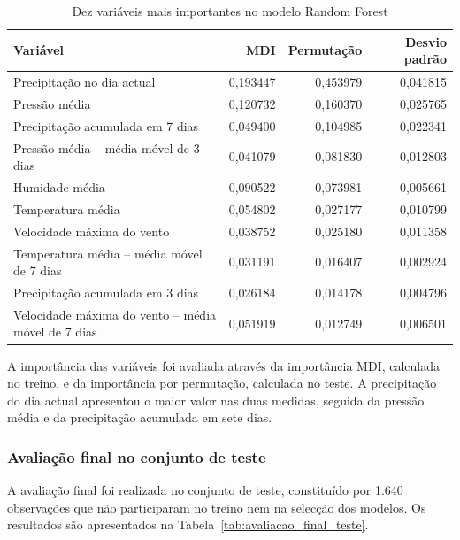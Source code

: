 \documentclass[9pt,twocolumn,twoside,english,portuguese]{opticajnl}
\begin{document}
    \begin{table}[H]
    \centering
    \footnotesize
    \caption{Dez variáveis mais importantes no modelo Random Forest}
    \label{tab:top10_importancia}
    \begin{tabular}{lrrr}
    \toprule
    \textbf{Variável} & \textbf{MDI} &
    \textbf{Permutação} & \textbf{Desvio padrão} \\
    \midrule
    Precipitação no dia actual & 0,193447 & 0,453979 & 0,041815 \\
    Pressão média & 0,120732 & 0,160370 & 0,025765 \\
    Precipitação acumulada em 7 dias & 0,049400 & 0,104985 & 0,022341 \\
    Pressão média -- média móvel de 3 dias & 0,041079 & 0,081830 & 0,012803 \\
    Humidade média & 0,090522 & 0,073981 & 0,005661 \\
    Temperatura média & 0,054802 & 0,027177 & 0,010799 \\
    Velocidade máxima do vento & 0,038752 & 0,025180 & 0,011358 \\
    Temperatura média -- média móvel de 7 dias & 0,031191 & 0,016407 & 0,002924 \\
    Precipitação acumulada em 3 dias & 0,026184 & 0,014178 & 0,004796 \\
    Velocidade máxima do vento -- média móvel de 7 dias & 0,051919 & 0,012749 & 0,006501 \\
    \bottomrule
    \end{tabular}
    \end{table}
    
    A importância das variáveis foi avaliada através da importância MDI, calculada no treino, e da importância por permutação, calculada no teste. A precipitação do dia actual apresentou o maior valor nas duas medidas, seguida da pressão média e da precipitação acumulada em sete dias.

    
    \subsubsection{Avaliação final no conjunto de teste}

A avaliação final foi realizada no conjunto de teste, constituído por 1.640 observações que não participaram no treino nem na selecção dos modelos. Os resultados são apresentados na Tabela~\ref{tab:avaliacao_final_teste}.
\end{document}
